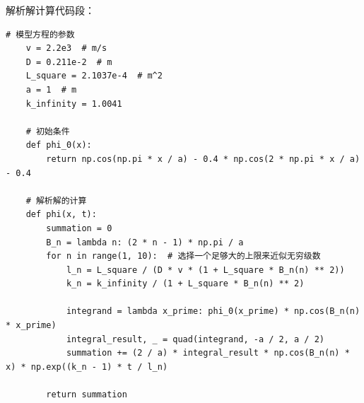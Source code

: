 \documentclass{Sichuan Normal University}
\begin{document}
\noindent 解析解计算代码段：
\begin{lstlisting}[style=python,basicstyle=\footnotesize\fontspec{Courier New},]  
    # 模型方程的参数
    v = 2.2e3  # m/s
    D = 0.211e-2  # m
    L_square = 2.1037e-4  # m^2
    a = 1  # m
    k_infinity = 1.0041

    # 初始条件
    def phi_0(x):
        return np.cos(np.pi * x / a) - 0.4 * np.cos(2 * np.pi * x / a) - 0.4
    
    # 解析解的计算
    def phi(x, t):
        summation = 0
        B_n = lambda n: (2 * n - 1) * np.pi / a
        for n in range(1, 10):  # 选择一个足够大的上限来近似无穷级数
            l_n = L_square / (D * v * (1 + L_square * B_n(n) ** 2))
            k_n = k_infinity / (1 + L_square * B_n(n) ** 2)
    
            integrand = lambda x_prime: phi_0(x_prime) * np.cos(B_n(n) * x_prime)
            integral_result, _ = quad(integrand, -a / 2, a / 2)
            summation += (2 / a) * integral_result * np.cos(B_n(n) * x) * np.exp((k_n - 1) * t / l_n)
    
        return summation
\end{lstlisting}
\end{document}
